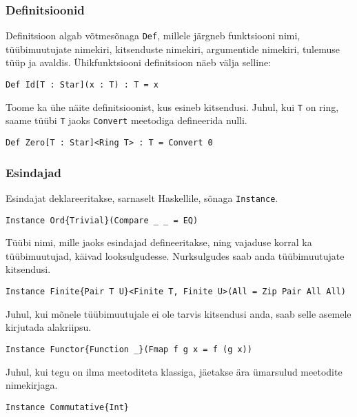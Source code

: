 \documentclass[12pt]{article}
\begin{document}
      \subsubsection{Definitsioonid}
        Definitsioon algab võtmesõnaga \verb!Def!, millele järgneb funktsiooni nimi, tüübimuutujate nimekiri, kitsenduste nimekiri, argumentide nimekiri, tulemuse tüüp ja avaldis. Ühikfunktsiooni definitsioon näeb välja selline:

        \begin{verbatim}Def Id[T : Star](x : T) : T = x\end{verbatim}

        Toome ka ühe näite definitsioonist, kus esineb kitsendusi. Juhul, kui \verb!T! on ring, saame tüübi \verb!T! jaoks \verb!Convert! meetodiga defineerida nulli.

        \begin{verbatim}Def Zero[T : Star]<Ring T> : T = Convert 0\end{verbatim}
      \subsubsection{Esindajad}
        Esindajat deklareeritakse, sarnaselt Haskellile, sõnaga \verb!Instance!.

        \begin{verbatim}Instance Ord{Trivial}(Compare _ _ = EQ)\end{verbatim}

        Tüübi nimi, mille jaoks esindajad defineeritakse, ning vajaduse korral ka tüübimuutujad, käivad looksulgudesse. Nurksulgudes saab anda tüübimuutujate kitsendusi.

        \begin{verbatim}Instance Finite{Pair T U}<Finite T, Finite U>(All = Zip Pair All All)\end{verbatim}

        Juhul, kui mõnele tüübimuutujale ei ole tarvis kitsendusi anda, saab selle asemele kirjutada alakriipsu.

        \begin{verbatim}Instance Functor{Function _}(Fmap f g x = f (g x))\end{verbatim}

        Juhul, kui tegu on ilma meetoditeta klassiga, jäetakse ära ümarsulud meetodite nimekirjaga.

        \begin{verbatim}Instance Commutative{Int}\end{verbatim}
\end{document}
